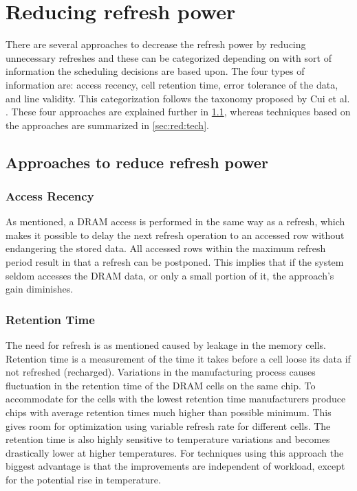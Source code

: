\section{Reducing refresh power} 
\label{sec:red}
There are several approaches to decrease the refresh power by reducing unnecessary refreshes and these can be categorized depending on with sort of information the scheduling decisions are based upon. The four types of information are: access recency, cell retention time, error tolerance of the data, and line validity. This categorization follows the taxonomy proposed by Cui et al. \cite{dtail}. These four approaches are explained further in \ref{sec:red:app}, whereas techniques based on the approaches are summarized in \ref{sec:red:tech}. 

\subsection{Approaches to reduce refresh power}
\label{sec:red:app}

\subsubsection*{\textbf{Access Recency}}
As mentioned, a DRAM access is performed in the same way as a refresh, which makes it possible to delay the next refresh operation to an accessed row without endangering the stored data. All accessed rows within the maximum refresh period result in that a refresh can be postponed. This implies that if the system seldom accesses the DRAM data, or only a small portion of it, the approach's gain diminishes.


\subsubsection*{\textbf{Retention Time}}
The need for refresh is as mentioned caused by leakage in the memory cells. Retention time is a measurement of the time it takes before a cell loose its data if not refreshed (recharged). Variations in the manufacturing process causes fluctuation in the retention time of the DRAM cells on the same chip. To accommodate for the cells with the lowest retention time manufacturers produce chips with average retention times much higher than possible minimum. This gives room for optimization using variable refresh rate for different cells. The retention time is also highly sensitive to temperature variations and becomes drastically lower at higher temperatures. For techniques using this approach the biggest advantage is that the improvements are independent of workload, except for the potential rise in temperature.   

